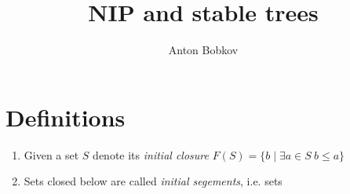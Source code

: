 \documentclass{amsart}
\begin{document}
\title{NIP and stable trees}
\author{Anton Bobkov}

\maketitle

\section{Definitions}

\begin{Definition}
	\begin{enumerate}
		\item Given a set $S$ denote its \emph{initial closure} $F(S) = \{b \mid \exists a \in S \ b \leq a\}$
		\item Sets closed below are called \emph{initial segements}, i.e. sets $$
	\end{enumerate}
\end{Definition}
\end{document}

